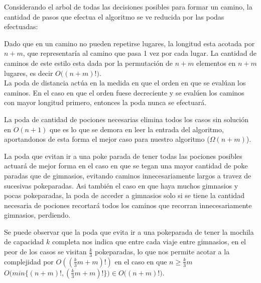 Considerando el arbol de todas las decisiones posibles para formar un camino, la cantidad de pasos que efectua el algoritmo se ve reducida por las podas efectuadas:

Dado que en un camino no pueden repetirse lugares, la longitud esta acotada por $n+m$, que representaría al camino que pasa 1 vez por cada lugar. La cantidad de caminos de este estilo esta dada por la permutación de $n+m$ elementos en $n+m$ lugares, es decir $O\Big ( (n+m)! \Big)$.\\

La poda de distancia actúa en la medida en que el orden en que se evalúan los caminos. En el caso en que el orden fuese decreciente y se evalúen los caminos con mayor longitud primero, entonces la poda nunca se efectuará.

La poda de cantidad de pociones necesarias elimina todos los casos sin solución en $O(n+1)$ que es lo que se demora en leer la entrada del algoritmo, aportandonos de esta forma el mejor caso para nuestro algoritmo ($\Omega(n+m)$).

La poda que evitan ir a una poke parada de tener todas las pociones posibles actuará de mejor forma en el caso en que se tegan una mayor cantidad de poke paradas que de gimnasios, evitando caminos innecesariamente largos a travez de sucesivas pokeparadas. Asi también el caso en que haya muchos gimnasios y pocas pokeparadas, la poda de acceder a gimnasios solo si se tiene la cantidad necesaria de pociones recortará todos los caminos que recorran innecesariamente gimnasios, perdiendo. 

Se puede observar que la poda que evita ir a una pokeparada de tener la mochila de capacidad $k$ completa nos indica que entre cada viaje entre gimnasios, en el peor de los casos se visitan $\frac{k}{3}$ pokeparadas, lo que nos permite acotar a la complejidad por $O((\frac{k}{3}m + m)!)$ en el caso en que $n\geq\frac{k}{3}m$ $O\Big(min\big\{ (n+m)!, (\frac{k}{3}m + m)! \big\}\Big) \in O\big((n+m)!\big)$.
 